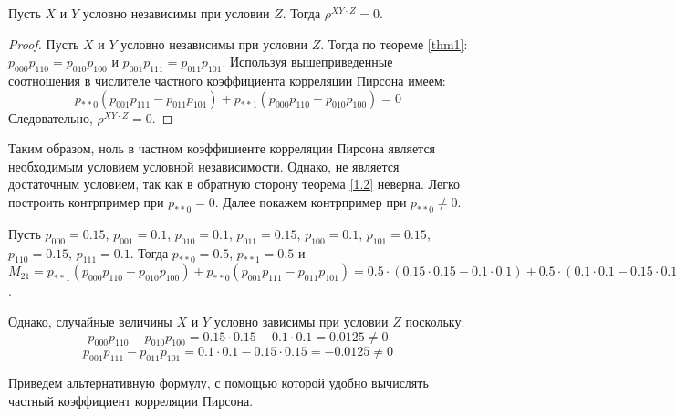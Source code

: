\begin{theorem}\label{1.2}
    Пусть $X$ и $Y$ условно независимы при условии $Z$. Тогда $\rho^{XY \cdot Z}=0$.
\end{theorem}
\begin{proof}
    Пусть $X$ и $Y$ условно независимы при условии $Z$. Тогда по теореме \ref{thm1}:
    $p_{000}p_{110}=p_{010}p_{100}$ и 
    $p_{001}p_{111}=p_{011}p_{101}$.
    Используя вышеприведенные соотношения в числителе частного коэффициента корреляции Пирсона имеем:
    $$
        p_{**0}(p_{001}p_{111}-p_{011}p_{101}) + p_{**1} (p_{000}p_{110}-p_{010}p_{100})= 0
    $$
    Следовательно, $\rho^{XY \cdot Z}=0$.
\end{proof}
Таким образом, ноль в частном коэффициенте корреляции Пирсона является необходимым условием условной независимости.
Однако, не является достаточным условием, так как в обратную сторону теорема \ref{1.2} неверна. Легко построить контрпример при $p_{**0}=0$. Далее покажем контрпример при $p_{**0} \neq 0$.
\begin{example}
    Пусть $p_{000}=0.15$, $p_{001}=0.1$, $p_{010}=0.1$, $p_{011}=0.15$, $p_{100}=0.1$, $p_{101}=0.15$, $p_{110}=0.15$, $p_{111}=0.1$.
    Тогда $p_{**0}=0.5$, $p_{**1}=0.5$ и
    $M_{21} = p_{**1}(p_{000}p_{110}-p_{010}p_{100}) + p_{**0}(p_{001}p_{111}-p_{011}p_{101})= 0.5 \cdot (0.15 \cdot 0.15 - 0.1 \cdot 0.1) + 0.5 \cdot (0.1 \cdot 0.1 - 0.15 \cdot 0.15) = 0$.

    Однако, случайные величины $X$ и $Y$ условно зависимы при условии $Z$ поскольку:
    $$
        p_{000}p_{110}-p_{010}p_{100}=0.15 \cdot 0.15 - 0.1 \cdot 0.1 = 0.0125 \neq 0
    $$
    $$
        p_{001}p_{111}-p_{011}p_{101}=0.1 \cdot 0.1 - 0.15 \cdot 0.15 = -0.0125 \neq 0
    $$
\end{example}

Приведем альтернативную формулу, с помощью которой удобно вычислять частный коэффициент корреляции Пирсона.

